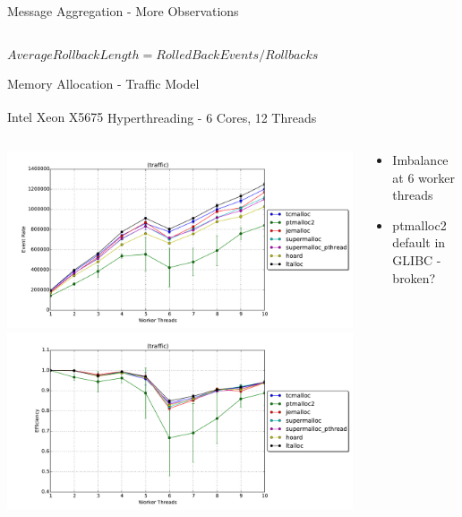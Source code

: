 \documentclass[10pt]{beamer}
\begin{document}
\begin{frame}{Message Aggregation - More Observations}
\begin{columns}
    \end{columns}

    \bigskip

    $AverageRollbackLength = RolledBackEvents/Rollbacks$

\end{frame}

\begin{frame}{Memory Allocation - Traffic Model}
    \begin{block}{Intel\textsuperscript{\textregistered} Xeon\textsuperscript{\textregistered} X5675}
        Hyperthreading - 6 Cores, 12 Threads
        \begin{columns}
        \begin{column}{0.5\textwidth}
            \smallskip
            \includegraphics[width=\textwidth]{../figs/memory_allocation/traffic_eventrate.pdf} \\
            \includegraphics[width=\textwidth]{../figs/memory_allocation/traffic_efficiency.pdf} \\
        \end{column}
        \begin{column}{0.5\textwidth}
            \begin{itemize}
                \item Imbalance at 6 worker threads
                \item ptmalloc2 default in GLIBC - broken?
            \end{itemize}
        \end{column}
        \end{columns}
    \end{block}
\end{frame}
\end{document}
